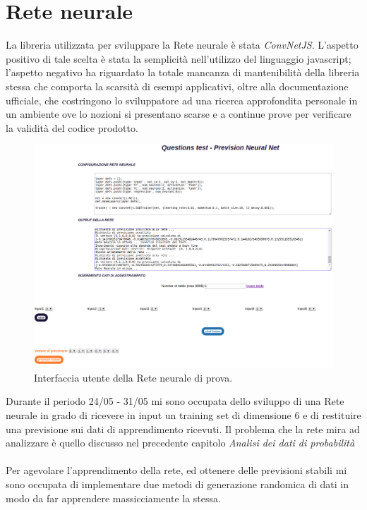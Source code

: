 \section{Rete neurale}
\label{Rete neurale}

La libreria utilizzata per sviluppare la Rete neurale \`e stata \textit{ConvNetJS}. L'aspetto positivo di tale scelta \`e stata la semplicit\`a nell'utilizzo del linguaggio javascript; l'aspetto negativo ha riguardato la totale mancanza di mantenibilit\`a della libreria stessa che comporta la scarsit\`a di esempi applicativi, oltre alla documentazione ufficiale, che costringono lo sviluppatore ad una ricerca approfondita personale in un ambiente ove lo nozioni si presentano scarse e a continue prove per verificare la validit\`a del codice prodotto.
\begin{figure}[H]
\centering
	\includegraphics[width=1\linewidth]{./image/GUI-rete-neurale.png}
	\caption{Interfaccia utente della Rete neurale di prova.}
	\label{Interfaccia utente della Rete neurale di prova.}
\end{figure}
\noindent
Durante il periodo 24/05 - 31/05 mi sono occupata dello sviluppo di una Rete neurale in grado di ricevere in input un training set di dimensione 6 e di restituire una previsione sui dati di apprendimento ricevuti.
\noindent
Il problema che la rete mira ad analizzare \`e quello discusso nel precedente capitolo \textit{Analisi dei dati di probabilit\`a}
\\\\
Per agevolare l'apprendimento della rete, ed ottenere delle previsioni stabili mi sono occupata di implementare due metodi di generazione randomica di dati in modo da far apprendere massicciamente la stessa.
